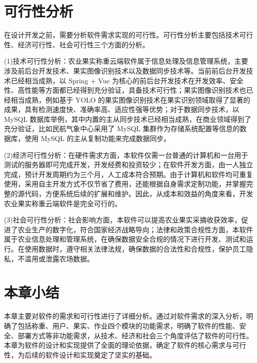 \section{可行性分析}\label{sec:req3}

在设计开发之前，需要分析软件需求实现的可行性。可行性分析主要包括技术可行性、经济可行性、社会可行性三个方面的分析\cite{叶俊民2006软件工程}。

(1)技术可行性分析：农业果实称重云端软件属于信息处理及信息管理系统，主要涉及前后台开发技术、果实图像识别技术以及数据同步技术等。当前前后台开发技术已经相当成熟，以 Spring + Vue 为核心的前后台开发技术在开发效率、安全性、高性能等方面都已经得到充分验证\cite{Qiu2021}\cite{Shan2021}，具备技术可行性；果实图像识别技术也已经相当成熟，例如基于 YOLO 的果实图像识别技术在果实识别领域取得了显著的成果，具有检测速度快、准确率高、适应性强等优势\cite{Lin2019}；对于数据同步技术，以 MySQL 数据库举例，其中内置的主从同步技术已经相当成熟，在商业领域得到了充分验证，比如民航气象中心采用了 MySQL 集群作为存储系统配置等信息的数据库，使用 MySQL 的主从复制功能来完成数据同步\cite{厍雯轩-2024}。

(2)经济可行性分析：在硬件需求方面，本软件仅需一台普通的计算机和一台用于测试的服务器即可完成开发，开发经费和投资较少；在软件开发方面，由一人独立完成，预计开发周期约为三个月，人工成本符合预期。由于计算机和软件均可重复使用，采用自主开发方式不仅节省了费用，还能根据自身需求定制功能，并掌握完整的源代码，方便系统后续的扩展和维护。因此，从成本和效益的角度来看，开发农业果实称重云端软件是完全可行的。

(3)社会可行性分析：社会影响方面，本软件可以提高农业果实采摘收获效率，促进了农业生产的数字化，符合国家经济战略导向\cite{Xu2020}；法律和政策合规性方面，本软件属于农业信息处理和管理系统，在确保数据安全合规的情况下进行开发、测试和运行。在使用数据时，遵守相关法律法规，确保数据的合法性和合规性，保护员工隐私，不滥用或泄露农场数据。

\section{本章小结}

本章主要对软件的需求和可行性进行了详细分析。通过对软件需求的深入分析，明确了包括称重、用户、果实、作业四个模块的功能需求，明确了软件的性能、安全、部署方式等非功能需求，从技术、经济和社会三个角度评估了软件的可行性。本章为软件的设计和实现提供了全面的理论依据，确定了软件的核心需求与可行性，为后续的软件设计和实现奠定了坚实的基础。
